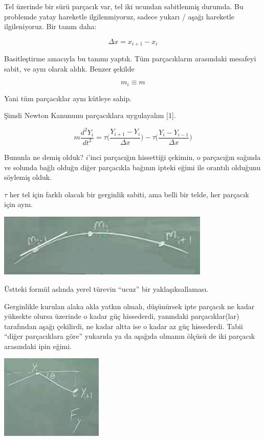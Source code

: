 \documentclass[12pt,fleqn]{article}\usepackage{../../common}
\begin{document}
Tel üzerinde bir sürü parçacık var, tel iki ucundan sabitlenmiş durumda. Bu
problemde yatay hareketle ilgilenmiyoruz, sadece yukarı / aşağı hareketle
ilgileniyoruz. Bir tanım daha:

$$ \Delta x = x_{i+1} - x_i  $$

Basitleştirme amacıyla bu tanımı yaptık. Tüm parçacıkların arasındaki
mesafeyi sabit, ve aynı olarak aldık. Benzer şekilde

$$ m_i \equiv m $$

Yani tüm parçacıklar aynı kütleye sahip. 

Şimdi Newton Kanununu parçacıklara uygulayalım [1]. 

$$ m \frac{d^2Y_i}{dt^2} = 
\tau \bigg( \frac{Y_{i+1}- Y_i}{\Delta x} \bigg) -
\tau \bigg( \frac{Y_{i}- Y_{i-1}}{\Delta x} \bigg) 
$$

Bununla ne demiş olduk? $i$'inci parçacığın hissettiği çekimin, o
parçacığın sağında ve solunda bağlı olduğu diğer parçacıkla bağının ipteki
eğimi ile orantılı olduğunu söylemiş olduk.

$\tau$ her tel için farklı olacak bir gerginlik sabiti, ama belli bir
telde, her parçacık için aynı. 

\includegraphics[height=3cm]{1_08.png}

Üstteki formül aslında yerel türevin ``ucuz'' bir yaklaşıksallaması. 

Gerginlikle kurulan alaka akla yatkın olmalı, düşünürsek ipte parçacık ne
kadar yüksekte olursa üzerinde o kadar güç hissederdi, yanındaki
parçacıklar(lar) tarafından aşağı çekilirdi, ne kadar altta ise o kadar az
güç hissederdi. Tabii ``diğer parçacıklara göre'' yukarıda ya da aşağıda
olmanın ölçüsü de iki parçacık arasındaki ipin eğimi. 

\includegraphics[height=4cm]{1_09.png}
\end{document}
